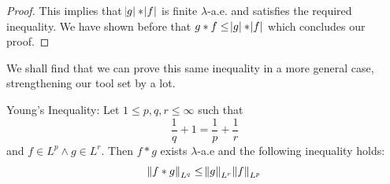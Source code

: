 \begin{proof}
This implies that $\abs{g}\ast\abs{f}$ is finite $\lambda$-a.e. and satisfies the required inequality. We have shown before that $ g \ast f \leq \abs{g}\ast\abs{f}$ which concludes our proof.

\end{proof}

We shall find that we can prove this same inequality in a more general case, strengthening our tool set by a lot.

\begin{theorem}
Young's Inequality: Let $1 \leq p,q,r \leq \infty$ such that
\begin{equation*}
\frac{1}{q} + 1 = \frac{1}{p}+\frac{1}{r}
\end{equation*}
and $f \in L^p \wedge g\in L^r$. Then $f \ast g$ exists $\lambda$-a.e and the following inequality holds:
\begin{equation*}
\norm{f \ast g}_{L^q} \leq \norm{g}_{L^r}\norm{f}_{L^p}
\end{equation*}
\end{theorem}

